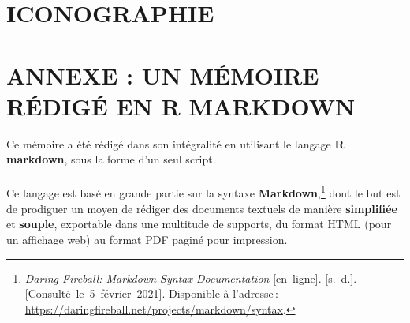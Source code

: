 \documentclass[
  11pt,
  french,
]{article}
\begin{document}
\newpage

\hypertarget{iconographie}{%
\section*{ICONOGRAPHIE}\label{iconographie}}

\renewcommand{\listfigurename}{}

\listoffigures

\newpage

\hypertarget{annexe-un-muxe9moire-ruxe9diguxe9-en-r-markdown}{%
\section*{ANNEXE : UN MÉMOIRE RÉDIGÉ EN R
MARKDOWN}\label{annexe-un-muxe9moire-ruxe9diguxe9-en-r-markdown}}

\linespread{2.0}

Ce mémoire a été rédigé dans son intégralité en utilisant le langage
\textbf{R markdown}, sous la forme d'un seul script.\\
~\\
Ce langage est basé en grande partie sur la syntaxe
\textbf{Markdown},\footnote{\emph{Daring Fireball: Markdown Syntax
  Documentation} {[}en~ligne{]}. {[}s.~d.{]}.
  {[}Consulté~le~5~février~2021{]}. Disponible à l'adresse\,:
  \url{https://daringfireball.net/projects/markdown/syntax}.} dont le
but est de prodiguer un moyen de rédiger des documents textuels de
manière \textbf{simplifiée} et \textbf{souple}, exportable dans une
multitude de supports, du format HTML (pour un affichage web) au format
PDF paginé pour impression.
\end{document}
